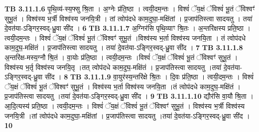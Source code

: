 \documentclass[17pt]{extarticle}
\begin{document}
{{{{{{{{{{{{{{{{{{{{{{                  \newline
                                \textbf{ TB 3.11.1.6} \newline
                  पृ॒थि॒व्य॑-स्य॒फ्सु श्रि॒ता । अ॒ग्नेः प्र॑ति॒ष्ठा । त्वयी॒दम॒न्तः । विश्वं॑ ॅय॒क्षं ॅविश्वं॑ भू॒तं ॅविश्वꣳ॑ सुभू॒तं । विश्व॑स्य भ॒र्त्री विश्व॑स्य जनयि॒त्री । तां त्वोप॑दधे काम॒दुघा॒-मक्षि॑तां । प्र॒जाप॑तिस्त्वा सादयतु । तया॑ दे॒वत॑या-ऽङ्गिर॒स्वद्-ध्रु॒वा सी॑द । \textbf{ 6} \newline
                  \newline
                                \textbf{ TB 3.11.1.7} \newline
                  अ॒ग्निर॑सि पृथि॒व्याꣳ श्रि॒तः । अ॒न्तरि॑क्षस्य प्रति॒ष्ठा । त्वयी॒दम॒न्तः । विश्वं॑ ॅय॒क्षं ॅविश्वं॑ भू॒तं ॅविश्वꣳ॑ सुभू॒तं ।विश्व॑स्य भ॒र्ता विश्व॑स्य जनयि॒ता । तं त्वोप॑दधे काम॒दुघ॒-मक्षि॑तं । प्र॒जाप॑तिस्त्वा सादयतु । तया॑ दे॒वत॑या-ऽङ्गिर॒स्वद्-ध्रु॒वा सी॑द । \textbf{ 7} \newline
                  \newline
                                \textbf{ TB 3.11.1.8} \newline
                  अ॒न्तरि॑क्ष-मस्य॒ग्नौ श्रि॒तं । वा॒योः प्र॑ति॒ष्ठा । त्वयी॒दम॒न्तः ।विश्वं॑ ॅय॒क्षं ॅविश्वं॑ भू॒तं ॅविश्वꣳ॑ सुभू॒तं । विश्व॑स्य भ॒र्तृ विश्व॑स्य जनयि॒तृ ।तत् त्वोप॑दधे काम॒दुघ॒-मक्षि॑तं । प्र॒जाप॑तिस्त्वा सादयतु ।तया॑ दे॒वत॑या-ऽङ्गिर॒स्वद्-ध्रु॒वा सी॑द । \textbf{ 8} \newline
                  \newline
                                \textbf{ TB 3.11.1.9} \newline
                  वा॒युर॑स्य॒न्तरि॑क्षे श्रि॒तः । दि॒वः प्र॑ति॒ष्ठा । त्वयी॒दम॒न्तः । विश्वं॑ ॅय॒क्षं ॅविश्वं॑ भू॒तं ॅविश्वꣳ॑ सुभू॒तं । विश्व॑स्य भ॒र्ता विश्व॑स्य जनयि॒ता ।तं त्वोप॑दधे काम॒दुघ॒-मक्षि॑तं । प्र॒जाप॑तिस्त्वा सादयतु ।तया॑ दे॒वत॑या-ऽङ्गिर॒स्वद्-ध्रु॒वा सी॑द । \textbf{ 9} \newline
                  \newline
                                \textbf{ TB 3.11.1.10} \newline
                  द्यौर॑सि वा॒यौ श्रि॒ता । आ॒दि॒त्यस्य॑ प्रति॒ष्ठा । त्वयी॒दम॒न्तः । विश्वं॑ ॅय॒क्षं ॅविश्वं॑ भू॒तं ॅविश्वꣳ॑ सुभू॒तं । विश्व॑स्य भ॒र्त्री विश्व॑स्य जनयि॒त्री ।तां त्वोप॑दधे काम॒दुघा॒-मक्षि॑तां । प्र॒जाप॑तिस्त्वा सादयतु ।तया॑ दे॒वत॑या-ऽङ्गिर॒स्वद्-ध्रु॒वा सी॑द । \textbf{ 10} \newline
                  \newline
}}}}}}}}}}}}}}}}}}}}}}
\end{document}
